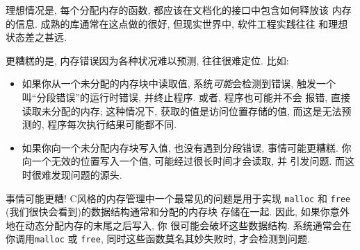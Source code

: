 \documentclass[12pt]{book}
\begin{document}
{%
理想情况是, 每个分配内存的函数, 都应该在文档化的接口中包含如何释放该
内存的信息. 成熟的库通常在这点做的很好, 但现实世界中, 软件工程实践往往
和理想状态差之甚远. 

更糟糕的是, 内存错误因为各种状况难以预测, 往往很难定位. 比如:

\begin{itemize}

\item 如果你从一个未分配的内存块中读取值, 系统{\em 可能}会检测到错误, 
触发一个叫``分段错误''的运行时错误, 并终止程序. 或者, 程序也可能并不会
报错, 直接读取未分配的内存; 这种情况下, 获取的值是访问位置存储的值, 
而这是无法预测的, 程序每次执行结果可能都不同.

\item 如果你向一个未分配内存块写入值, 也没有遇到分段错误, 事情可能更糟糕.  你向一个无效的位置写入一个值, 可能经过很长时间才会读取, 并
引发问题. 而这时很难发现问题的源头. 

\end{itemize} 

事情可能更糟! C风格的内存管理中一个最常见的问题是用于实现
{\tt malloc} 和 {\tt free}  (我们很快会看到)的数据结构通常和分配的内存块
存储在一起. 因此, 如果你意外地在动态分配内存的末尾之后写入, 你
很可能会破坏这些数据结构. 系统通常会在你调用{\tt malloc} 或
{\tt free}, 同时这些函数莫名其妙失败时, 才会检测到问题. 


}
\end{document}
